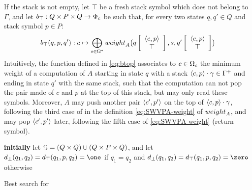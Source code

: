 %
\noindent
If the stack is not empty, let $\top$ be a fresh stack symbol which does not belong to $\Gamma$,
and let $b_\top : Q \times P \times Q \to \Phic$ be such that,
for every two states $q, q' \in Q$ 
and stack symbol $p \in P$: %
\begin{equation}\label{eq:btop}
  b_\top(q, p, q') : c \mapsto \bigoplus_{s\in \Omega^*} 
  \textstyle
  \weight_A\bigl(\configup{q}{\< c, p> \stackup \top }, s, \configup{q'}{\<c, p> \stackup \top}\bigr)
\end{equation}
%
Intuitively, the function defined in \eqref{eq:btop}
associates to $c \in \Omegac$ 
the minimum weight of a computation of $A$
starting in state $q$ with a stack 
$\<c, p> \cdot \gamma \in \Gamma^+$ 
and ending in state $q'$ with the same stack,
such that the computation can not pop 
the pair made of $c$ and $p$ at the top of this stack,
but may only read these symbols.
Moreover, $A$ may push another pair $\< c', p'>$ %
on the top of $\<c, p> \cdot \gamma$,
following the third case of 
in the definition \eqref{eq:SWVPA-weight} of $\weight_A$,
and may pop $\< c', p'>$ later, following the fifth case of \eqref{eq:SWVPA-weight} (return symbol). 

\begin{algorithm}

\textbf{initially} let $\mathcal{Q} = (Q \times Q) \cup (Q \times P \times Q)$, %
and let $d_\bot(q_1, q_2) = d_\top(q_1, p, q_2) = \one$ 
if $q_1 = q_2$ and $d_\bot(q_1, q_2) = d_\top(q_1, p, q_2) = \zero$ otherwise$\;$

\smallskip\noindent
{}
\caption{Best search for \SWVPA}
\label{algo:Dijkstra}
\end{algorithm}

